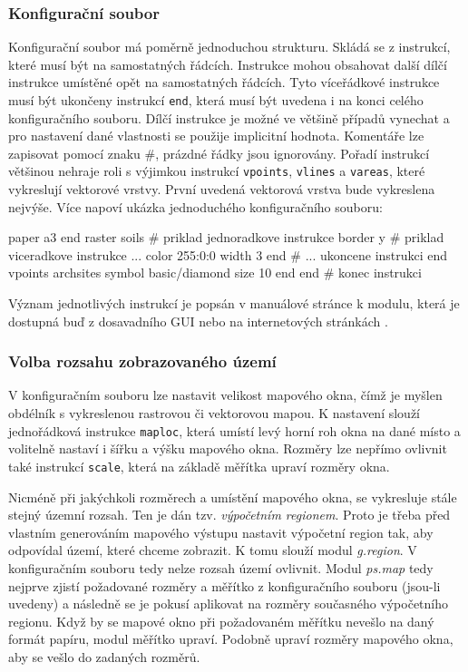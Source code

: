 \documentclass[a4paper,12pt,draft]{article}
\newcommand{\modul}[1]{\emph{#1}}
\newcommand{\instr}[1]{\lstinline[style=psmapInline]|#1|}
\begin{document}
\subsubsection{Konfigurační soubor}
Konfigurační soubor má poměrně jednoduchou strukturu. Skládá se z instrukcí, které musí být na samostatných řádcích. Instrukce mohou obsahovat další dílčí instrukce umístěné opět na samostatných řádcích. Tyto víceřádkové instrukce musí být ukončeny  instrukcí \instr{end}, která musí být uvedena i na konci celého konfiguračního souboru. Dílčí instrukce je možné ve většině případů vynechat a pro nastavení dané vlastnosti se použije implicitní hodnota. Komentáře lze zapisovat pomocí znaku \#, prázdné řádky jsou ignorovány. Pořadí instrukcí většinou nehraje roli s výjimkou instrukcí \instr{vpoints}, \instr{vlines} a \instr{vareas}, které vykreslují vektorové vrstvy. První uvedená vektorová vrstva bude vykreslena nejvýše. Více napoví ukázka jednoduchého konfiguračního souboru:
\begin{psmap}
paper a3
end
raster soils            # priklad jednoradkove instrukce
border y                # priklad viceradkove instrukce ...
   color 255:0:0
   width 3
end                     # ... ukoncene instrukci end
vpoints archsites
   symbol basic/diamond
   size 10
end
end                     # konec instrukci
\end{psmap}
Význam jednotlivých instrukcí je popsán v manuálové stránce k modulu, která je dostupná buď z dosavadního GUI nebo na internetových stránkách \cite{manual}.

\subsubsection{Volba rozsahu zobrazovaného území}
\label{sec:psmap:rozsah}
V konfiguračním souboru lze nastavit velikost mapového okna, čímž je myšlen obdélník s vykreslenou rastrovou či vektorovou mapou.  K nastavení slouží jednořádková instrukce \instr{maploc}, která umístí levý horní roh okna na dané místo a volitelně nastaví i šířku a výšku mapového okna. Rozměry lze nepřímo ovlivnit také instrukcí \instr{scale}, která na základě měřítka upraví rozměry okna. 

Nicméně při jakýchkoli rozměrech a umístění mapového okna, se vykresluje stále stejný územní rozsah. Ten je dán tzv. \emph{výpočetním regionem}. Proto je třeba před vlastním generováním mapového výstupu nastavit výpočetní region tak, aby odpovídal území, které chceme zobrazit. K tomu slouží modul \modul{g.region}. V konfiguračním souboru tedy nelze rozsah území ovlivnit.
Modul \modul{ps.map} tedy nejprve zjistí požadované rozměry a měřítko z konfiguračního souboru (jsou-li uvedeny) a následně se je pokusí aplikovat na rozměry současného výpočetního regionu. Když by se mapové okno při požadovaném měřítku nevešlo na daný formát papíru, modul měřítko upraví. Podobně upraví rozměry mapového okna, aby se vešlo do zadaných rozměrů.
\end{document}
